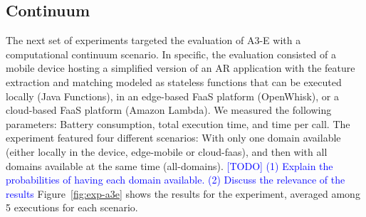 
\subsection{Continuum} The next set of experiments targeted the evaluation of A3-E with a computational continuum scenario. In specific, the evaluation consisted of a mobile device hosting a simplified version of an AR application with the feature extraction and matching modeled as stateless functions that can be executed locally (Java Functions), in an edge-based FaaS platform (OpenWhisk), or a cloud-based FaaS platform (Amazon Lambda). We measured the following parameters: Battery consumption, total execution time, and time per call. The experiment featured four different scenarios: With only one domain available (either locally in the device, edge-mobile or cloud-faas), and then with all domains available at the same time (all-domains). \textcolor{blue}{[TODO] (1) Explain the probabilities of having each domain available. (2) Discuss the relevance of the results} 
Figure~\ref{fig:exp-a3e} shows the results for the experiment, averaged among 5 executions for each scenario.

